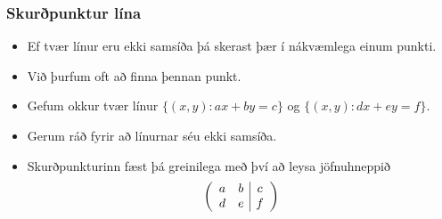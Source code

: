 \documentclass{beamer}
\newcommand\env[2]
{
	\begin{#1}
	#2
	\end{#1}
}
\begin{document}
\env{frame}
{
	\frametitle{Skurðpunktur lína}
	\env{itemize}
	{
		\item<1-> Ef tvær línur eru ekki samsíða þá skerast þær í nákvæmlega einum punkti.
		\item<2-> Við þurfum oft að finna þennan punkt.
		\item<3-> Gefum okkur tvær línur $\{(x, y) : ax+by=c\}$ og $\{(x, y) : dx+ey=f\}$.
		\item<4-> Gerum ráð fyrir að línurnar séu ekki samsíða.
		\item<5-> Skurðpunkturinn fæst þá greinilega með því að leysa jöfnuhneppið
			\[
				\left (
				\begin{array}{c c | c}
					a & b & c\\
					d & e & f
				\end{array}
				\right )
			\]
	}
}
\end{document}
